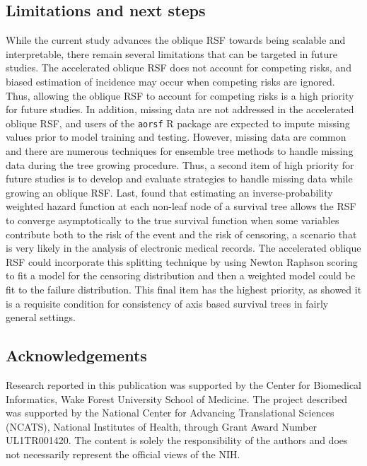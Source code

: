 \documentclass{article}\usepackage[]{graphicx}\usepackage[]{xcolor}
\begin{document}
\subsection{Limitations and next steps}

While the current study advances the oblique RSF towards being scalable and interpretable, there remain several limitations that can be targeted in future studies. The accelerated oblique RSF does not account for competing risks, and biased estimation of incidence may occur when competing risks are ignored. Thus, allowing the oblique RSF to account for competing risks is a high priority for future studies. In addition, missing data are not addressed in the accelerated oblique RSF, and users of the \texttt{aorsf} R package are expected to impute missing values prior to model training and testing. However, missing data are common and there are numerous techniques for ensemble tree methods to handle missing data during the tree growing procedure. Thus, a second item of high priority for future studies is to develop and evaluate strategies to handle missing data while growing an oblique RSF. Last, \citet{cui2017consistency} found that estimating an inverse-probability weighted hazard function at each non-leaf node of a survival tree allows the RSF to converge asymptotically to the true survival function when some variables contribute both to the risk of the event and the risk of censoring, a scenario that is very likely in the analysis of electronic medical records. The accelerated oblique RSF could incorporate this splitting technique by using Newton Raphson scoring to fit a model for the censoring distribution and then a weighted model could be fit to the failure distribution. This final item has the highest priority, as \citet{cui2017consistency} showed it is a requisite condition for consistency of axis based survival trees in fairly general settings.


\subsection*{Acknowledgements}

Research reported in this publication was supported by the Center for Biomedical Informatics, Wake Forest University School of Medicine. The project described was supported by the National Center for Advancing Translational Sciences (NCATS), National Institutes of Health, through Grant Award Number UL1TR001420. The content is solely the responsibility of the authors and does not necessarily represent the official views of the NIH.
\end{document}
